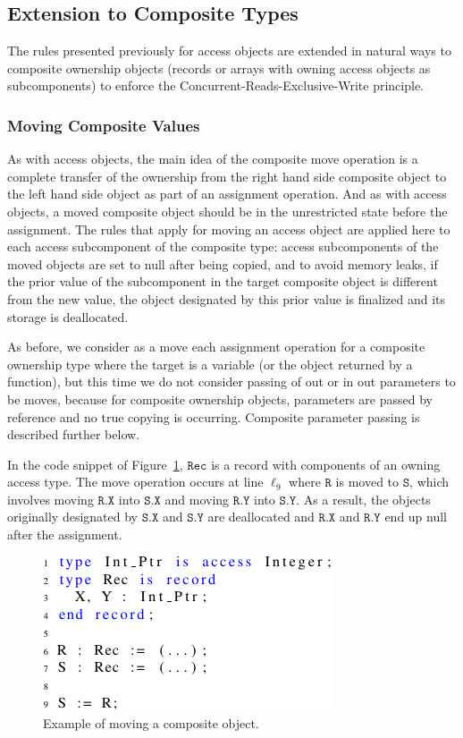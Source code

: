 \documentclass{llncs}
\newcommand\var[1]{\ensuremath{\mathtt{#1}}}
\newcommand{\keyword}[1]{\textsf{#1}}
\begin{document}
\subsection{Extension to Composite Types}
\label{subsec:ownershipComposite}

The rules presented previously for access objects are extended in natural ways to composite ownership objects (records or arrays with owning access objects as subcomponents) to enforce the Concurrent-Reads-Exclusive-Write principle.

\subsubsection{Moving Composite Values}
\label{subsubsec:movingComposite}

As with access objects, the main idea of the composite move operation is a complete transfer of the ownership from the right hand side composite object to the left hand
side object as part of an assignment operation. And as with access objects, a moved composite object should be in the unrestricted state before the assignment. The rules that apply for moving an
access object are applied here to each access subcomponent of the composite type: access subcomponents of the moved objects are set to null after being copied, and to avoid memory leaks, if the
prior value of the subcomponent in the target composite object is different from the new value, the object designated by this prior value is finalized and its storage is deallocated.

As before, we consider as a move each assignment operation for a composite ownership type where the target is a variable (or the object returned by a function), but this time we do not
consider passing of \keyword{out} or \keyword{in out} parameters to be moves, because for composite ownership objects, parameters are passed by reference and no true copying is occurring. Composite parameter passing is described further below.

In the code snippet of Figure~\ref{fig:movingComposite}, \var{Rec} is a record with components of an owning access type. The move operation occurs at line $\ell_{9}$ where \var{R} is moved
to \var{S}, which involves moving \var{R.X} into \var{S.X} and moving \var{R.Y} into \var{S.Y}. As a result, the objects originally designated by
\var{S.X} and \var{S.Y} are deallocated and \var{R.X} and \var{R.Y} end up null after the assignment.


\begin{figure}[htb!]
\centering
   \includegraphics[]{movingComposite}
   \caption{Example of moving a composite object.}
   \label{fig:movingComposite}
\end{figure}
\end{document}
